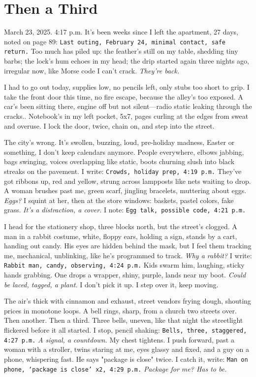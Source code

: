 \documentclass[12pt,oneside]{book} %
\newcommand{\note}[1]{\texttt{#1}}
\begin{document}
\chapter{Then a Third}

March 23, 2025. 4:17 p.m. It’s been weeks since I left the apartment, 27 days, noted on page 89: \note{Last outing, February 24, minimal contact, safe return.} Too much has piled up: the feather’s still on my table, shedding tiny barbs; the lock’s hum echoes in my head; the drip started again three nights ago, irregular now, like Morse code I can’t crack. \textit{They’re back.}

I had to go out today, supplies low, no pencils left, only stubs too short to grip. I take the front door this time, no fire escape, because the alley’s too exposed. A car’s been sitting there, engine off but not silent—radio static leaking through the cracks.. Notebook’s in my left pocket, 5x7, pages curling at the edges from sweat and overuse. I lock the door, twice, chain on, and step into the street.

The city’s wrong. It’s swollen, buzzing, loud, pre-holiday madness, Easter or something, I don’t keep calendars anymore. People everywhere, elbows jabbing, bags swinging, voices overlapping like static, boots churning slush into black streaks on the pavement. I write: \note{Crowds, holiday prep, 4:19 p.m.} They’ve got ribbons up, red and yellow, strung across lampposts like nets waiting to drop. A woman brushes past me, green scarf, jingling bracelets, muttering about eggs. \textit{Eggs?} I squint at her, then at the store windows: baskets, pastel colors, fake grass. \textit{It’s a distraction, a cover.} I note: \note{Egg talk, possible code, 4:21 p.m.}

I head for the stationery shop, three blocks north, but the street’s clogged. A man in a rabbit costume, white, floppy ears, holding a sign, stands by a cart, handing out candy. His eyes are hidden behind the mask, but I feel them tracking me, mechanical, unblinking, like he’s programmed to track. \textit{Why a rabbit?} I write: \note{Rabbit man, candy, observing, 4:24 p.m.} Kids swarm him, laughing, sticky hands grabbing. One drops a wrapper, shiny, purple, lands near my boot. \textit{Could be laced, tagged, a plant.} I don’t pick it up. I step over it, keep moving.

The air’s thick with cinnamon and exhaust, street vendors frying dough, shouting prices in monotone loops. A bell rings, sharp, from a church two streets over. Then another. Then a third. Three bells, uneven, like that night the streetlight flickered before it all started. I stop, pencil shaking: \note{Bells, three, staggered, 4:27 p.m.} \textit{A signal, a countdown.} My chest tightens. I push forward, past a woman with a stroller, twins staring at me, eyes glassy and fixed, and a guy on a phone, whispering fast. He says "package is close" twice. I catch it, write: \note{Man on phone, ‘package is close’ x2, 4:29 p.m.} \textit{Package for me? Has to be.}
\end{document}
